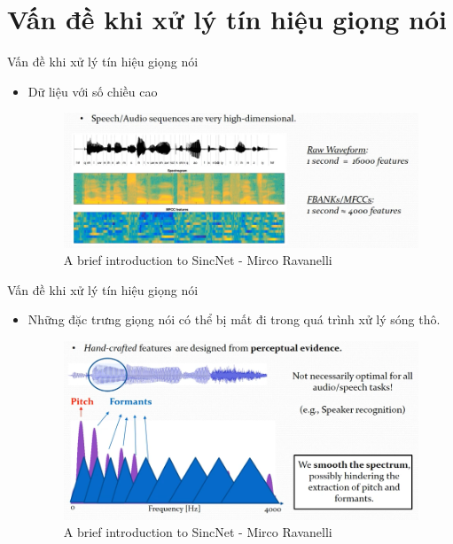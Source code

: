 \documentclass[11pt]{beamer}
\begin{document}
\section{Vấn đề khi xử lý tín hiệu giọng nói}
\begin{frame}{Vấn đề khi xử lý tín hiệu giọng nói}
	\begin{itemize}
		\item Dữ liệu với số chiều cao
		\begin{figure}[H]
			\includegraphics[width=1\linewidth]{images/capture_01.png}
			\caption{A brief introduction to SincNet - Mirco Ravanelli}
			\label{fig:writing-thesis}
		\end{figure}
	\end{itemize}
\end{frame}
\begin{frame}{Vấn đề khi xử lý tín hiệu giọng nói}
	\begin{itemize}
		\item Những đặc trưng giọng nói có thể bị mất đi trong quá trình xử lý sóng thô.
		\begin{figure}[H]
			\includegraphics[width=0.9\linewidth]{images/perceptual_evidence.png}
			\caption{A brief introduction to SincNet - Mirco Ravanelli}
			\label{fig:writing-thesis}
		\end{figure}
	\end{itemize}
\end{frame}
\end{document}
